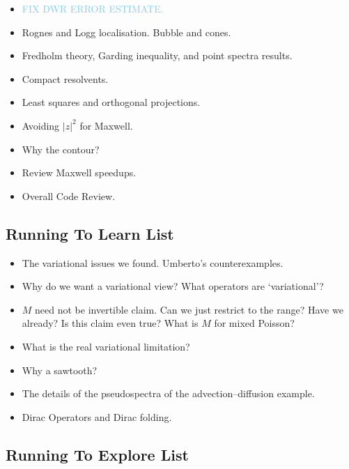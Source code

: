 \documentclass[12pt,a4paper]{article}
\newcommand{\skyblue}[1]{\textcolor{SkyBlue}{#1}}
\begin{document}
\begin{itemize}
    \item \skyblue{FIX DWR ERROR ESTIMATE.}
    \item Rognes and Logg localisation. Bubble and cones. 
    \item Fredholm theory, Garding inequality, and point spectra results. 
    \item Compact resolvents.
    \item Least squares and orthogonal projections.
    \item Avoiding $|z|^2$ for Maxwell. 
    \item Why the contour?
    \item Review Maxwell speedups.
    \item Overall Code Review.
    
\end{itemize}


\subsection{Running To Learn List}

\begin{itemize}
    \item The variational issues we found. Umberto's counterexamples. 
        \item Why do we want a variational view? What operators are `variational'?
    \item $M$ need not be invertible claim. Can we just restrict to the range? Have we already? Is this claim even true? What is $M$ for mixed Poisson? 
    \item What is the real variational limitation? 
    \item Why a sawtooth?
    \item The details of the pseudospectra of the advection--diffusion example. 
    \item Dirac Operators and Dirac folding.
    
\end{itemize}

\subsection{Running To Explore List}
\end{document}
